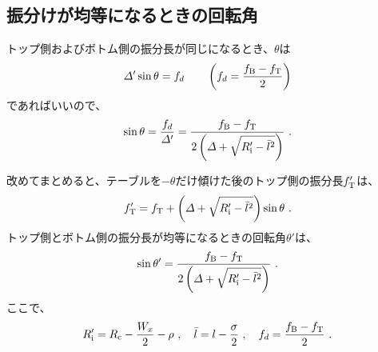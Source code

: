 \subsection{振分けが均等になるときの回転角}
トップ側およびボトム側の振分長が同じになるとき、$\theta$は
\begin{align*}
  \varDelta'\sin\theta = f_d \qquad \left(f_d = \frac{f_\text B-f_\text T}2\right)
\end{align*}
であればいいので、
\begin{align*}
  \sin\theta = \frac{f_d}{\varDelta'} = \frac{f_\text B-f_\text T}{2\left(\varDelta+\sqrt{R_\text i'-\bar l^2}\right)}~.
\end{align*}
\begin{hosokubox}
改めてまとめると、テーブルを$-\theta$だけ傾けた後のトップ側の振分長$f_\text T'$は、
\begin{align*}
  f_\text T' = f_\text T+\left(\varDelta+\sqrt{R_\text i'-\bar l^2}\right)\sin\theta\ .
\end{align*}
トップ側とボトム側の振分長が均等になるときの回転角$\theta'$は、
\begin{align*}
  \sin\theta' = \frac{f_\text B-f_\text T}{2\left(\varDelta+\sqrt{R_\text i'-\bar l^2}\right)}\ .
\end{align*}
ここで、
\begin{align*}
  R_\text i' = R_\text c-\frac{W_x}2-\rho\ ,\quad
  \bar l = l-\frac\sigma2\ ,\quad
  f_d = \frac{f_\text B-f_\text T}2\ .
\end{align*}
\end{hosokubox}





